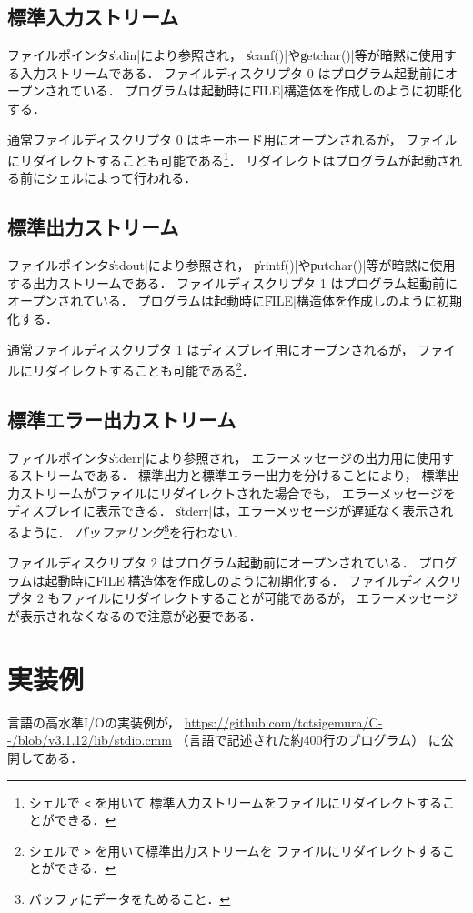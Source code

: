 \subsection{標準入力ストリーム}
ファイルポインタ\|stdin|により参照され，
\|scanf()|や\|getchar()|等が暗黙に使用する入力ストリームである．
ファイルディスクリプタ 0 はプログラム起動前にオープンされている．
プログラムは起動時に\|FILE|構造体を作成しのように初期化する．

通常ファイルディスクリプタ 0 はキーホード用にオープンされるが，
ファイルにリダイレクトすることも可能である\footnote{
シェルで \texttt{<} を用いて
標準入力ストリームをファイルにリダイレクトすることができる．}．
リダイレクトはプログラムが起動される前にシェルによって行われる．

\subsection{標準出力ストリーム}
ファイルポインタ\|stdout|により参照され，
\|printf()|や\|putchar()|等が暗黙に使用する出力ストリームである．
ファイルディスクリプタ 1 はプログラム起動前にオープンされている．
プログラムは起動時に\|FILE|構造体を作成しのように初期化する．

通常ファイルディスクリプタ 1 はディスプレイ用にオープンされるが，
ファイルにリダイレクトすることも可能である\footnote{
シェルで \texttt{>} を用いて標準出力ストリームを
ファイルにリダイレクトすることができる．
}．

\subsection{標準エラー出力ストリーム}
ファイルポインタ\|stderr|により参照され，
エラーメッセージの出力用に使用するストリームである．
標準出力と標準エラー出力を分けることにより，
標準出力ストリームがファイルにリダイレクトされた場合でも，
エラーメッセージをディスプレイに表示できる．
\|stderr|は，エラーメッセージが遅延なく表示されるように．
\emph{バッファリング}\footnote{バッファにデータをためること．}を行わない．

ファイルディスクリプタ 2 はプログラム起動前にオープンされている．
プログラムは起動時に\|FILE|構造体を作成しのように初期化する．
ファイルディスクリプタ 2 もファイルにリダイレクトすることが可能であるが，
エラーメッセージが表示されなくなるので注意が必要である．

\section{実装例}
\cmm 言語の高水準I/Oの実装例が，
\url{https://github.com/tctsigemura/C--/blob/v3.1.12/lib/stdio.cmm}
（\cmm 言語で記述された約400行のプログラム）
に公開してある．

